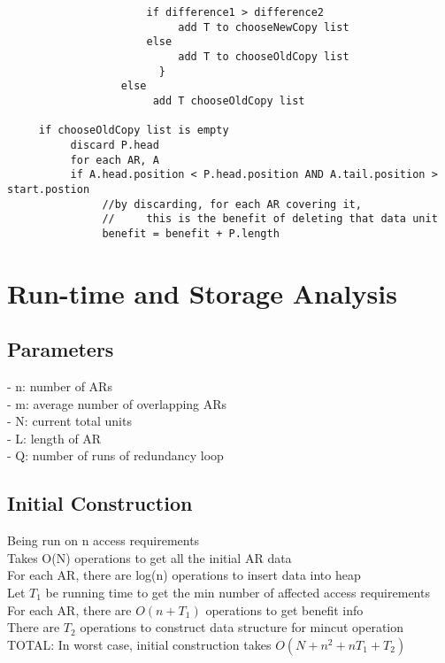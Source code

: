 \documentclass[11pt,psfig]{article}
\begin{document}
\begin{verbatim}
                      if difference1 > difference2
                           add T to chooseNewCopy list
                      else
                           add T to chooseOldCopy list
			            }
                  else
                       add T chooseOldCopy list
			
     if chooseOldCopy list is empty
          discard P.head
          for each AR, A
          if A.head.position < P.head.position AND A.tail.position > start.postion
               //by discarding, for each AR covering it, 
               //     this is the benefit of deleting that data unit
               benefit = benefit + P.length

\end{verbatim}

\section*{Run-time and Storage Analysis}


\subsection*{Parameters}
- n: number of ARs\\
- m: average number of overlapping ARs\\
- N: current total units\\
- L: length of AR\\
- Q: number of runs of redundancy loop\\

\subsection*{Initial Construction}
	Being run on n access requirements\\
	Takes O(N) operations to get all the initial AR data\\
	For each AR, there are log(n) operations to insert data into heap\\
	Let $T_1$ be running time to get the min number of affected access requirements\\
	For each AR, there are $O(n + T_1)$ operations to get benefit info\\
	There are $T_2$ operations to construct data structure for mincut operation\\
	TOTAL: In worst case, initial construction takes $O(N + n^2 + n T_1 + T_2)$\\
\end{document}
